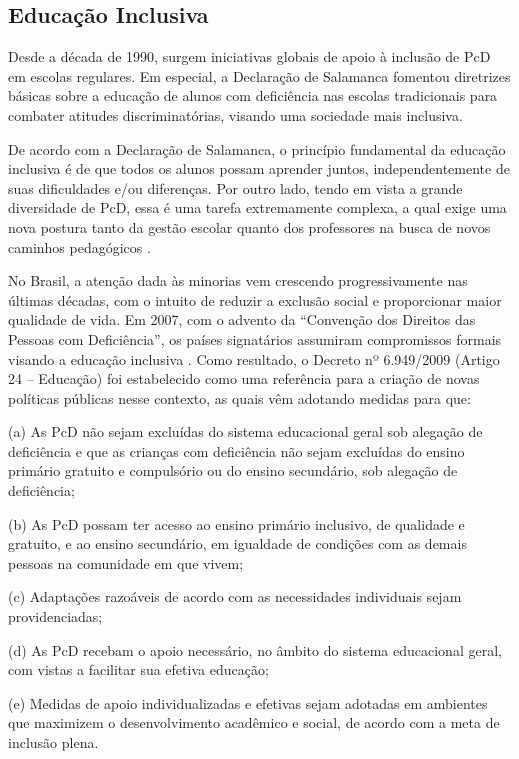 \subsection{Educação Inclusiva}
\label{fundamentacao-teorica:linguas-sinais:educacao-inclusiva}

Desde a década de 1990, surgem iniciativas globais de apoio à inclusão de PcD em escolas regulares. Em especial, a Declaração de Salamanca \cite{UNESCO1994} fomentou diretrizes básicas sobre a educação de alunos com deficiência nas escolas tradicionais para combater atitudes discriminatórias, visando uma sociedade mais inclusiva.

De acordo com a Declaração de Salamanca, o princípio fundamental da educação inclusiva é de que todos os alunos possam aprender juntos, independentemente de suas dificuldades e/ou diferenças. Por outro lado, tendo em vista a grande diversidade de PcD, essa é uma tarefa extremamente complexa, a qual exige uma nova postura tanto da gestão escolar quanto dos professores na busca de novos caminhos pedagógicos \cite{David2015}.

No Brasil, a atenção dada às minorias vem crescendo progressivamente nas últimas décadas, com o intuito de reduzir a exclusão social e proporcionar maior qualidade de vida. Em 2007, com o advento da ``Convenção dos Direitos das Pessoas com Deficiência'', os países signatários assumiram compromissos formais visando a educação inclusiva \cite{David2015,Quadros2019}. Como resultado, o Decreto nº 6.949/2009 (Artigo 24 -- Educação) foi estabelecido como uma referência para a criação de novas políticas públicas nesse contexto, as quais vêm adotando medidas para que:

\begin{citacao}
(a) As PcD não sejam excluídas do sistema educacional geral sob alegação de deficiência e que as crianças com deficiência não sejam excluídas do ensino primário gratuito e compulsório ou do ensino secundário, sob alegação de deficiência;

(b) As PcD possam ter acesso ao ensino primário inclusivo, de qualidade e gratuito, e ao ensino secundário, em igualdade de condições com as demais pessoas na comunidade em que vivem;

(c) Adaptações razoáveis de acordo com as necessidades individuais sejam providenciadas;

(d) As PcD recebam o apoio necessário, no âmbito do sistema educacional geral, com vistas a facilitar sua efetiva educação;

(e) Medidas de apoio individualizadas e efetivas sejam adotadas em ambientes que maximizem o desenvolvimento acadêmico e social, de acordo com a meta de inclusão plena.
\end{citacao}

